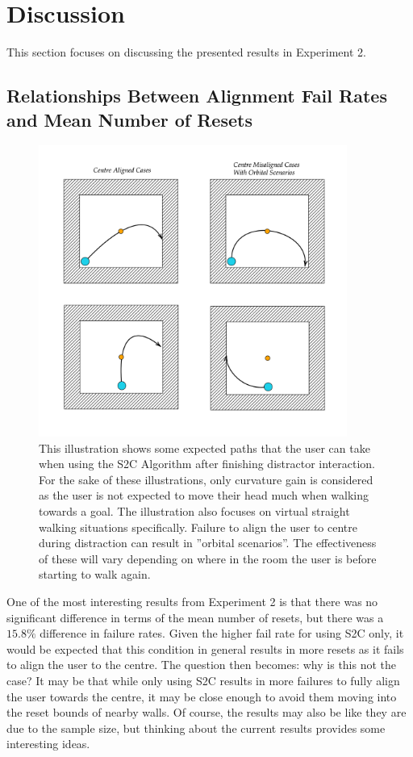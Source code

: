 \section{Discussion}
This section focuses on discussing the presented results in Experiment 2.

\subsection{Relationships Between Alignment Fail Rates and Mean Number of Resets}\label{sec:orbitalCases}
\begin{figure}[tbph]
    \centering
    \includegraphics[width=0.9\textwidth]{figures/graphs/orbitalcases.png}
    \caption[Various S2C Redirection Scenarios During Success/Failure of Centre Alignment]{This illustration shows some expected paths that the user can take when using the S2C Algorithm after finishing distractor interaction. For the sake of these illustrations, only curvature gain is considered as the user is not expected to move their head much when walking towards a goal. The illustration also focuses on virtual straight walking situations specifically. Failure to align the user to centre during distraction can result in ''orbital scenarios''. The effectiveness of these will vary depending on where in the room the user is before starting to walk again.}
    \label{fig:orbitalCases}
\end{figure}

One of the most interesting results from Experiment 2 is that there was no significant difference in terms of the mean number of resets, but there was a $15.8\%$ difference in failure rates. Given the higher fail rate for using S2C only, it would be expected that this condition in general results in more resets as it fails to align the user to the centre. The question then becomes: why is this not the case? It may be that while only using S2C results in more failures to fully align the user towards the centre, it may be close enough to avoid them moving into the reset bounds of nearby walls. Of course, the results may also be like they are due to the sample size, but thinking about the current results provides some interesting ideas. 

